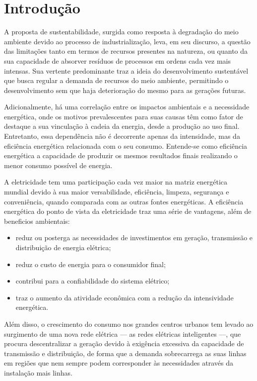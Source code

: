 \chapter{Introdução}

A proposta de sustentabilidade, surgida como resposta à degradação do
meio ambiente devido ao processo de industrialização, leva, em seu
discurso, a questão das limitações tanto em termos de recursos
presentes na natureza, ou quanto da sua capacidade de absorver resíduos
de processos em ordens cada vez mais intensas. Sua vertente
predominante traz a ideia do desenvolvimento sustentável que busca
regular a demanda de recursos do meio ambiente, permitindo o
desenvolvimento sem que haja deterioração do mesmo para as gerações
futuras.

Adicionalmente, há uma correlação entre os impactos ambientais e a
necessidade energética, onde os motivos prevalescentes para suas
causas têm como fator de destaque a sua vinculação à cadeia da
energia, desde a produção ao uso final. Entretanto, essa dependência
não é decorrente apenas da intensidade, mas da eficiência energética
relacionada com o seu consumo. Entende-se como eficiência energética a
capacidade de produzir os mesmos resultados finais realizando o menor
consumo possível de energia.

A eletricidade tem uma participação cada vez maior na matriz
energética mundial devido à sua maior versabilidade, eficiência,
limpeza, segurança e conveniência, quando comparada com as outras
fontes energéticas. A eficiência energética do ponto de vista da
eletricidade traz uma série de vantagens, além de beneficios
ambientais:

\begin{itemize}
\item reduz ou posterga as necessidades de investimentos em geração, transmissão 
e distribuição de energia elétrica; 
\item reduz o custo de energia para o consumidor final; 
\item contribui para a confiabilidade do sistema elétrico; 
\item traz o aumento da atividade econômica com a redução da intensividade
energética. 
\end{itemize}

Além disso, o crescimento do consumo nos grandes centros urbanos tem
levado ao surgimento de uma nova rede elétrica --- as redes elétricas
inteligentes ---, que procura descentralizar a geração devido à
exigência excessiva da capacidade de transmissão e distribuição, de
forma que a demanda sobrecarrega as suas linhas em regiões que nem
sempre podem corresponder às necessidades através da instalação mais
linhas. 

